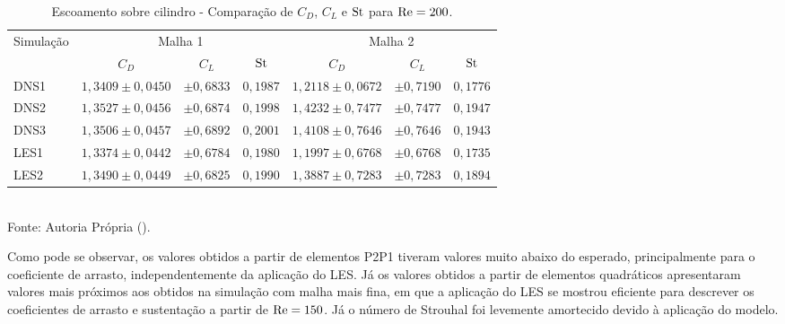 \begin{table}[h!]
    \centering
    \caption{Escoamento sobre cilindro - Comparação de $C_D$, $C_L$ e $\mathrm{St}$ para $\mathrm{Re}=200$.}
    \begin{tabular}{lcccccc}
        \hline
        \multirow{2}{*}{Simulação} & \multicolumn{3}{c}{Malha 1} & \multicolumn{3}{c}{Malha 2}                                                         \\\cline{2-7}
                                   & $C_D$                       & $C_L$                       & $\mathrm{St}$   & $C_D$             & $C_L$       & $\mathrm{St}$   \\\hline
        DNS1                       & $1,3409\pm0,0450$           & $\pm0,6833$                 & $0,1987$ & $1,2118\pm0,0672$ & $\pm0,7190$ & $0,1776$ \\
        DNS2                       & $1,3527\pm0,0456$           & $\pm0,6874$                 & $0,1998$ & $1,4232\pm0,7477$ & $\pm0,7477$ & $0,1947$ \\
        DNS3                       & $1,3506\pm0,0457$           & $\pm0,6892$                 & $0,2001$ & $1,4108\pm0,7646$ & $\pm0,7646$ & $0,1943$ \\
        LES1                       & $1,3374\pm0,0442$           & $\pm0,6784$                 & $0,1980$ & $1,1997\pm0,6768$ & $\pm0,6768$ & $0,1735$ \\
        LES2                       & $1,3490\pm0,0449$           & $\pm0,6825$                 & $0,1990$ & $1,3887\pm0,7283$ & $\pm0,7283$ & $0,1894$ \\\hline
    \end{tabular}
    \\Fonte: Autoria Própria (\the\year).
    \label{tab:cyl-comp200}
\end{table}

Como pode se observar, os valores obtidos a partir de elementos P2P1 tiveram valores muito abaixo do esperado, principalmente para o coeficiente de arrasto, independentemente da aplicação do LES. Já os valores obtidos a partir de elementos quadráticos apresentaram valores mais próximos aos obtidos na simulação com malha mais fina, em que a aplicação do LES se mostrou eficiente para descrever os coeficientes de arrasto e sustentação a partir de $\mathrm{Re}=150$. Já o número de Strouhal foi levemente amortecido devido à aplicação do modelo.

